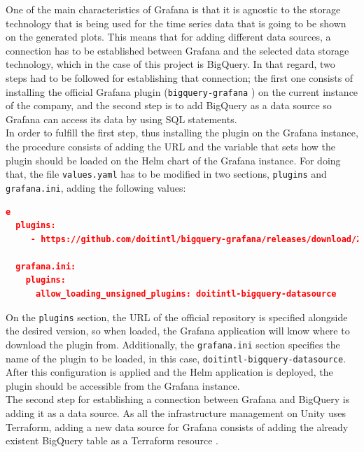 \documentclass[english, 12pt, a4paper, sci, utf8, a-1b, online]{aaltothesis}
\begin{document}
One of the main characteristics of Grafana is that it is agnostic to the storage technology that is being used for the time series data that is going to be shown on the generated plots. This means that for adding different data sources, a connection has to be established between Grafana and the selected data storage technology, which in the case of this project is BigQuery. In that regard, two steps had to be followed for establishing that connection; the first one consists of installing the official Grafana plugin (\texttt{bigquery-grafana} \cite{GrafanaPlugin}) on the current instance of the company, and the second step is to add BigQuery as a data source so Grafana can access its data by using SQL statements.\\

In order to fulfill the first step, thus installing the plugin on the Grafana instance, the procedure consists of adding the URL and the variable that sets how the plugin should be loaded on the Helm chart of the Grafana instance. For doing that, the file \texttt{values.yaml} has to be modified in two sections, \texttt{plugins} and \texttt{grafana.ini}, adding the following values:\\

\begin{lstlisting}[language=json,firstnumber=1]e
  plugins:
     - https://github.com/doitintl/bigquery-grafana/releases/download/2.0.3/doitintl-bigquery-datasource-2.0.3.zip;doit-bigquery-datasource

  grafana.ini:
    plugins:
      allow_loading_unsigned_plugins: doitintl-bigquery-datasource
\end{lstlisting}

On the \texttt{plugins} section, the URL of the official repository is specified alongside the desired version, so when loaded, the Grafana application will know where to download the plugin from. Additionally, the \texttt{grafana.ini} section specifies the name of the plugin to be loaded, in this case, \texttt{doitintl-bigquery-datasource}. After this configuration is applied and the Helm application is deployed, the plugin should be accessible from the Grafana instance. \\

The second step for establishing a connection between Grafana and BigQuery is adding it as a data source. As all the infrastructure management on Unity uses Terraform, adding a new data source for Grafana consists of adding the already existent BigQuery table as a Terraform resource \cite{TerraformResource}.\\
\end{document}
